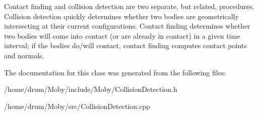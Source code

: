 Contact finding and collision detection are two separate, but related, procedures. Collision detection quickly determines whether two bodies are geometrically intersecting at their current configurations. Contact finding determines whether two bodies will come into contact (or are already in contact) in a given time interval; if the bodies do/will contact, contact finding computes contact points and normals. 

The documentation for this class was generated from the following files\-:\begin{DoxyCompactItemize}
\item 
/home/drum/\-Moby/include/\-Moby/Collision\-Detection.\-h\item 
/home/drum/\-Moby/src/Collision\-Detection.\-cpp\end{DoxyCompactItemize}
